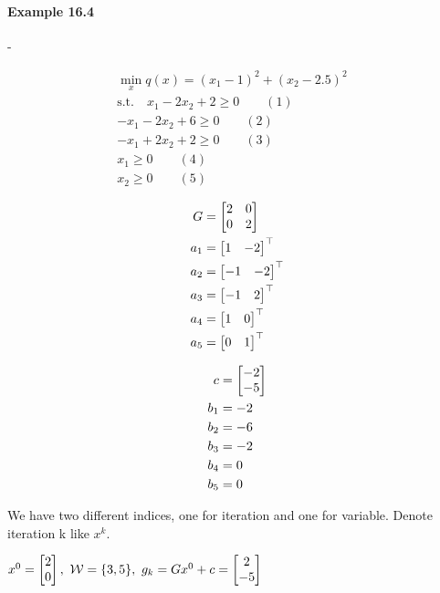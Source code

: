 \documentclass{article}
\begin{document}
\paragraph{Example 16.4}-

\medskip \begin{minipage}[c]{0.5\textwidth}
  \centering
\end{minipage}
\begin{minipage}[c]{0.5\textwidth}
  \begin{align*}
    \min_x q(x) = (x_1-1)^2 + (x_2-2.5)^2& \\ 
    \text{s.t.}\quad x_1 -2x_2+2 \geq 0 \qquad(1)& \\ 
    -x_1-2x_2+6 \geq 0 \qquad(2)& \\ 
    -x_1+2x_2+2  \geq 0 \qquad(3)& \\ 
    x_1 \geq 0 \qquad(4)&  \\ 
    x_2 \geq 0 \qquad(5) 
  \end{align*}
\end{minipage}

\begin{minipage}[t]{0.2\textwidth}
  \begin{align*}
    G &= \begin{bmatrix} 2 & 0 \\ 0 & 2 \end{bmatrix}  \\ 
    a_1 &=\begin{bmatrix} 1 & -2 \end{bmatrix}^{\top} \\ 
    a_2 &=\begin{bmatrix} -1 & -2 \end{bmatrix}^{\top} \\ 
    a_3 &=\begin{bmatrix} -1 & 2 \end{bmatrix}^{\top} \\ 
    a_4 &=\begin{bmatrix} 1 & 0 \end{bmatrix}^{\top} \\ 
    a_5&=\begin{bmatrix} 0 & 1 \end{bmatrix}^{\top} 
  \end{align*}
\end{minipage}
\begin{minipage}[t]{0.2\textwidth}
  \begin{align*}
    c &= \begin{bmatrix} -2 \\ -5 \end{bmatrix} \\ 
    b_1 &= -2 \\ 
    b_2 & =-6 \\ 
    b_3&= -2 \\ 
    b_4 &= 0 \\ 
    b_5 &= 0
  \end{align*}  
\end{minipage}

We have two different indices, one for iteration and one for variable. Denote iteration k like $x^k$.

\medskip $x^{0} = \begin{bmatrix} 2 \\ 0 \end{bmatrix},\ \mathcal{W}= \{3, 5\} ,\ g_k = Gx^{0}+ c = \begin{bmatrix} 2 \\ -5 \end{bmatrix}$
\end{document}
